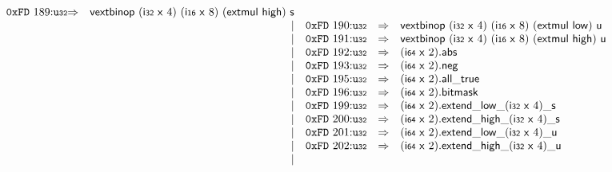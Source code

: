 $$\begin{array}{@{}l@{}rrlll@{}l@{}}
\mathtt{0xFD}~189{:}{\mathtt{u{\scriptstyle32}}} &\Rightarrow& \mathsf{vextbinop}~(\mathsf{i{\scriptstyle32}}~\mathsf{x}~4)~(\mathsf{i{\scriptstyle16}}~\mathsf{x}~8)~(\mathsf{extmul}~\mathsf{high})~\mathsf{s} \\ &&|&
\mathtt{0xFD}~190{:}{\mathtt{u{\scriptstyle32}}} &\Rightarrow& \mathsf{vextbinop}~(\mathsf{i{\scriptstyle32}}~\mathsf{x}~4)~(\mathsf{i{\scriptstyle16}}~\mathsf{x}~8)~(\mathsf{extmul}~\mathsf{low})~\mathsf{u} \\ &&|&
\mathtt{0xFD}~191{:}{\mathtt{u{\scriptstyle32}}} &\Rightarrow& \mathsf{vextbinop}~(\mathsf{i{\scriptstyle32}}~\mathsf{x}~4)~(\mathsf{i{\scriptstyle16}}~\mathsf{x}~8)~(\mathsf{extmul}~\mathsf{high})~\mathsf{u} \\ &&|&
\mathtt{0xFD}~192{:}{\mathtt{u{\scriptstyle32}}} &\Rightarrow& (\mathsf{i{\scriptstyle64}}~\mathsf{x}~2) . \mathsf{abs} \\ &&|&
\mathtt{0xFD}~193{:}{\mathtt{u{\scriptstyle32}}} &\Rightarrow& (\mathsf{i{\scriptstyle64}}~\mathsf{x}~2) . \mathsf{neg} \\ &&|&
\mathtt{0xFD}~195{:}{\mathtt{u{\scriptstyle32}}} &\Rightarrow& (\mathsf{i{\scriptstyle64}}~\mathsf{x}~2) . \mathsf{all\_true} \\ &&|&
\mathtt{0xFD}~196{:}{\mathtt{u{\scriptstyle32}}} &\Rightarrow& (\mathsf{i{\scriptstyle64}}~\mathsf{x}~2).\mathsf{bitmask} \\ &&|&
\mathtt{0xFD}~199{:}{\mathtt{u{\scriptstyle32}}} &\Rightarrow& (\mathsf{i{\scriptstyle64}}~\mathsf{x}~2) . {{{{{{\mathsf{extend}}{\mathsf{\_}}}{\mathsf{low}}}{\mathsf{\_}}}{(\mathsf{i{\scriptstyle32}}~\mathsf{x}~4)}}{\mathsf{\_}}}{\mathsf{s}} \\ &&|&
\mathtt{0xFD}~200{:}{\mathtt{u{\scriptstyle32}}} &\Rightarrow& (\mathsf{i{\scriptstyle64}}~\mathsf{x}~2) . {{{{{{\mathsf{extend}}{\mathsf{\_}}}{\mathsf{high}}}{\mathsf{\_}}}{(\mathsf{i{\scriptstyle32}}~\mathsf{x}~4)}}{\mathsf{\_}}}{\mathsf{s}} \\ &&|&
\mathtt{0xFD}~201{:}{\mathtt{u{\scriptstyle32}}} &\Rightarrow& (\mathsf{i{\scriptstyle64}}~\mathsf{x}~2) . {{{{{{\mathsf{extend}}{\mathsf{\_}}}{\mathsf{low}}}{\mathsf{\_}}}{(\mathsf{i{\scriptstyle32}}~\mathsf{x}~4)}}{\mathsf{\_}}}{\mathsf{u}} \\ &&|&
\mathtt{0xFD}~202{:}{\mathtt{u{\scriptstyle32}}} &\Rightarrow& (\mathsf{i{\scriptstyle64}}~\mathsf{x}~2) . {{{{{{\mathsf{extend}}{\mathsf{\_}}}{\mathsf{high}}}{\mathsf{\_}}}{(\mathsf{i{\scriptstyle32}}~\mathsf{x}~4)}}{\mathsf{\_}}}{\mathsf{u}} \\ &&|&

\end{array}$$
